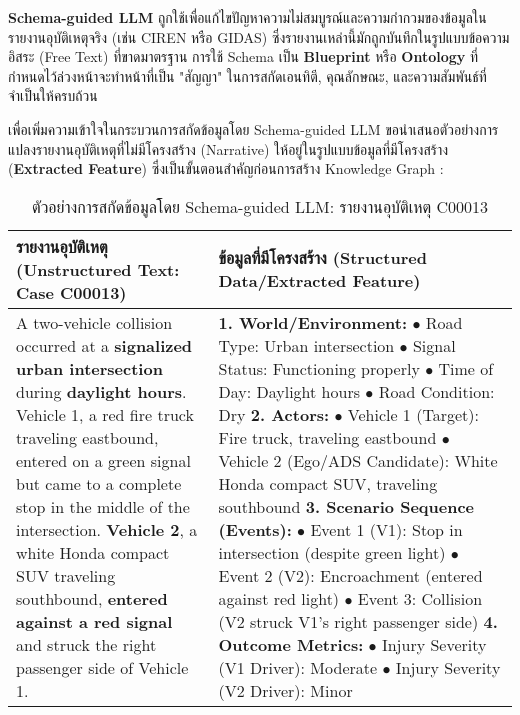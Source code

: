 \textbf{Schema-guided LLM} ถูกใช้เพื่อแก้ไขปัญหาความไม่สมบูรณ์และความกำกวมของข้อมูลในรายงานอุบัติเหตุจริง (เช่น CIREN หรือ GIDAS) \cite{nhtsa_ciren, gidas_study} ซึ่งรายงานเหล่านี้มักถูกบันทึกในรูปแบบข้อความอิสระ (Free Text) ที่ขาดมาตรฐาน การใช้ Schema เป็น \textbf{Blueprint} หรือ \textbf{Ontology} ที่กำหนดไว้ล่วงหน้าจะทำหน้าที่เป็น "สัญญา" ในการสกัดเอนทิตี, คุณลักษณะ, และความสัมพันธ์ที่จำเป็นให้ครบถ้วน

เพื่อเพิ่มความเข้าใจในกระบวนการสกัดข้อมูลโดย Schema-guided LLM ขอนำเสนอตัวอย่างการแปลงรายงานอุบัติเหตุที่ไม่มีโครงสร้าง (Narrative) ให้อยู่ในรูปแบบข้อมูลที่มีโครงสร้าง (\textbf{Extracted Feature}) ซึ่งเป็นขั้นตอนสำคัญก่อนการสร้าง Knowledge Graph \cite{bagschik2018ontology}:

\begin{table}[h!]
\centering
\caption{ตัวอย่างการสกัดข้อมูลโดย Schema-guided LLM: รายงานอุบัติเหตุ C00013}
\label{tab:sgllm_example}
\begin{tabularx}{\textwidth}{|p{}|X|}
\hline
\rowcolor{gray!20} \textbf{รายงานอุบัติเหตุ (Unstructured Text: Case C00013)} & \textbf{ข้อมูลที่มีโครงสร้าง (Structured Data/Extracted Feature)} \\
\hline
A two-vehicle collision occurred at a \textbf{signalized urban intersection} during \textbf{daylight hours}. Vehicle 1, a red fire truck traveling eastbound, entered on a green signal but came to a complete stop in the middle of the intersection. \textbf{Vehicle 2}, a white Honda compact SUV traveling southbound, \textbf{entered against a red signal} and struck the right passenger side of Vehicle 1. & \textbf{1. World/Environment:} \newline
\quad $\bullet$ Road Type: Urban intersection \newline
\quad $\bullet$ Signal Status: Functioning properly \newline
\quad $\bullet$ Time of Day: Daylight hours \newline
\quad $\bullet$ Road Condition: Dry \newline
\textbf{2. Actors:} \newline
\quad $\bullet$ Vehicle 1 (Target): Fire truck, traveling eastbound \newline
\quad $\bullet$ Vehicle 2 (Ego/ADS Candidate): White Honda compact SUV, traveling southbound \newline
\textbf{3. Scenario Sequence (Events):} \newline
\quad $\bullet$ Event 1 (V1): Stop in intersection (despite green light) \newline
\quad $\bullet$ Event 2 (V2): Encroachment (entered against red light) \newline
\quad $\bullet$ Event 3: Collision (V2 struck V1's right passenger side) \newline
\textbf{4. Outcome Metrics:} \newline
\quad $\bullet$ Injury Severity (V1 Driver): Moderate \newline
\quad $\bullet$ Injury Severity (V2 Driver): Minor \\
\hline
\end{tabularx}
\end{table}

